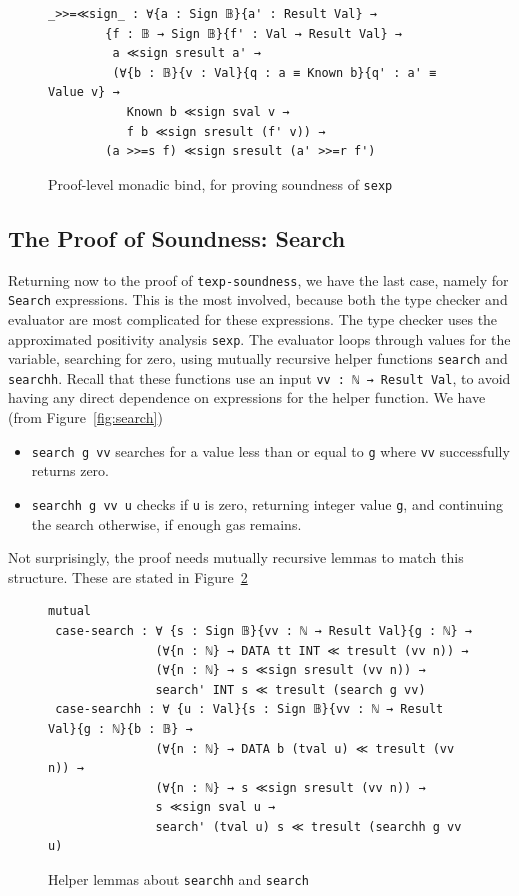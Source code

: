 \documentclass[acmsmall,screen,review]{acmart}
\begin{document}
\begin{figure}
\begin{verbatim}
_>>=≪sign_ : ∀{a : Sign 𝔹}{a' : Result Val} →
        {f : 𝔹 → Sign 𝔹}{f' : Val → Result Val} → 
         a ≪sign sresult a' →
         (∀{b : 𝔹}{v : Val}{q : a ≡ Known b}{q' : a' ≡ Value v} →
           Known b ≪sign sval v → 
           f b ≪sign sresult (f' v)) → 
        (a >>=s f) ≪sign sresult (a' >>=r f')
\end{verbatim}
\caption{Proof-level monadic bind, for proving soundness of \texttt{sexp}}
\label{fig:bindllsign}
\end{figure}


\subsection{The Proof of Soundness: Search}

Returning now to the proof of \verb|texp-soundness|, we have the last
case, namely for \verb|Search| expressions.  This is the most
involved, because both the type checker and evaluator are most
complicated for these expressions.  The type checker uses the
approximated positivity analysis \verb|sexp|.  The evaluator loops
through values for the variable, searching for zero, using mutually
recursive helper functions \verb|search| and \verb|searchh|.  Recall
that these functions use an input \verb|vv : ℕ → Result Val|, to avoid
having any direct dependence on expressions for the helper function.
We have (from Figure~\ref{fig:search})
\begin{itemize}
\item \verb|search g vv| searches for a value less than or equal to \verb|g| where
  \verb|vv| successfully returns zero.
\item \verb|searchh g vv u| checks if \verb|u| is zero, returning integer value \verb|g|, and continuing the search
  otherwise, if enough gas remains.
\end{itemize}
\noindent Not surprisingly, the proof needs mutually recursive lemmas to match this
structure.  These are stated in Figure~\ref{fig:lemsearch}



\begin{figure}
\begin{verbatim}
mutual
 case-search : ∀ {s : Sign 𝔹}{vv : ℕ → Result Val}{g : ℕ} →
               (∀{n : ℕ} → DATA tt INT ≪ tresult (vv n)) → 
               (∀{n : ℕ} → s ≪sign sresult (vv n)) →
               search' INT s ≪ tresult (search g vv)
 case-searchh : ∀ {u : Val}{s : Sign 𝔹}{vv : ℕ → Result Val}{g : ℕ}{b : 𝔹} →
               (∀{n : ℕ} → DATA b (tval u) ≪ tresult (vv n)) → 
               (∀{n : ℕ} → s ≪sign sresult (vv n)) →
               s ≪sign sval u → 
               search' (tval u) s ≪ tresult (searchh g vv u)
\end{verbatim}
\caption{Helper lemmas about \texttt{searchh} and \texttt{search}}
\label{fig:lemsearch}
\end{figure}
\end{document}
